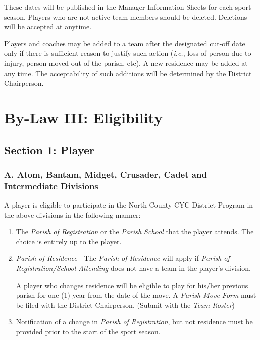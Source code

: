 These dates will be published in the Manager Information Sheets for each sport season.  Players who are not active team members should be deleted.  Deletions will be accepted at anytime.

Players and coaches may be added to a team after the designated cut-off date only if there is sufficient reason to justify such action ({\em i.e.}, loss of person due to injury, person moved out of the parish, etc).  A new residence may be added at any time.  The acceptability of such additions will be determined by the District Chairperson.

\section{By-Law III: Eligibility}
\label{sec:bylaw-3}
\subsection{Section 1: Player}
\label{ssec:bylaw-3-1}
\subsubsection{A. Atom, Bantam, Midget, Crusader, Cadet and Intermediate Divisions}
A player is eligible to participate in the North County CYC District Program in the above divisions in the following manner:

\begin{enumerate}[1.]
    \item The {\em Parish of Registration} or the {\em Parish School} that the player attends.  The choice is entirely up to the player.
    \item {\em Parish of Residence}  -  The {\em Parish of Residence} will apply if {\em Parish of Registration/School Attending} does not have a team in the player's division.
    
    A player who changes residence will be eligible to play for his/her previous parish for one (1) year from the date of the move.  A {\em Parish Move Form} must be filed with the District Chairperson.  (Submit with the {\em Team Roster})

    \item Notification of a change in {\em Parish of Registration}, but not residence must be provided prior to the start of the sport season.
\end{enumerate}

